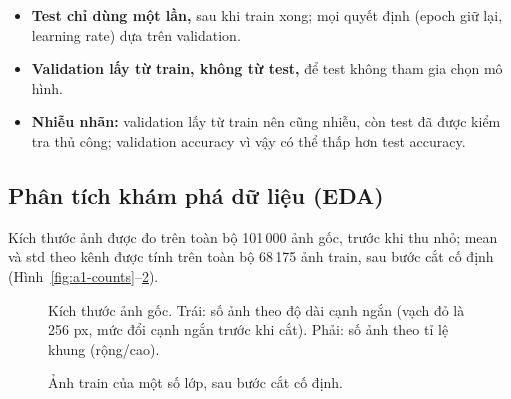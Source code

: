 \documentclass[a4paper,12pt]{article}
\begin{document}
\begin{itemize}
    \item \textbf{Test chỉ dùng một lần,} sau khi train xong; mọi quyết định (epoch giữ lại, learning rate) dựa trên validation.
    \item \textbf{Validation lấy từ train, không từ test,} để test không tham gia chọn mô hình.
    \item \textbf{Nhiễu nhãn:} validation lấy từ train nên cũng nhiễu, còn test đã được kiểm tra thủ công; validation accuracy vì vậy có thể thấp hơn test accuracy.
\end{itemize}

\subsection{Phân tích khám phá dữ liệu (EDA)}\label{sec:a1-eda}
Kích thước ảnh được đo trên toàn bộ 101\,000 ảnh gốc, trước khi thu nhỏ; mean và std theo kênh được tính trên toàn bộ 68\,175 ảnh train, sau bước cắt cố định (Hình~\ref{fig:a1-counts}--\ref{fig:a1-samples}).

\begin{figure}[!htbp]
    \centering
    \caption{Kích thước ảnh gốc. Trái: số ảnh theo độ dài cạnh ngắn (vạch đỏ là 256 px, mức đổi cạnh ngắn trước khi cắt). Phải: số ảnh theo tỉ lệ khung (rộng/cao).}\label{fig:a1-sizes}
\end{figure}
\begin{figure}[!htbp]
    \centering
    \caption{Ảnh train của một số lớp, sau bước cắt cố định.}\label{fig:a1-samples}
\end{figure}
\end{document}
